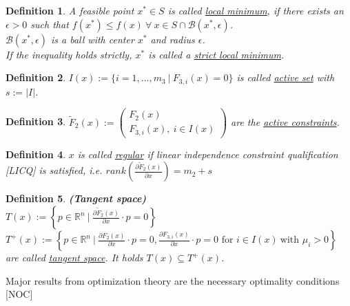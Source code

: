 \documentclass{scrartcl}[12pt, halfparskip]
\numberwithin{equation}{section}
\numberwithin{figure}{section}
\numberwithin{table}{section}
\newtheorem{Definition}{Definition}
\begin{document}
\begin{Definition}
	A feasible point $x^* \in S$ is called \underline{local minimum}, if there exists an $\epsilon > 0$ such that $f(x^*) \le f(x) \ \forall \ x \in S \cap \mathcal{B}(x^*, \epsilon)$. \\
	$\mathcal{B}(x^*, \epsilon)$ is a ball with center $x^*$ and radius $\epsilon$. \\
	If the inequality holds strictly, $x^*$ is called a \underline{strict local minimum}.
\end{Definition}

\begin{Definition}
	$I(x) := \{ i=1,...,m_3 \ | \ F_{3,i}(x) = 0 \}$ is called \underline{active set} with $s := \vert I \vert$.
\end{Definition}

\begin{Definition}
	$\tilde{F}_2(x) := 
	\begin{pmatrix}
		F_2(x) \\
		F_{3,i}(x), \ i \in I(x) 
	\end{pmatrix}$
	are the \underline{active constraints}.
\end{Definition}

\begin{Definition}
	$x$ is called \underline{regular} if linear independence constraint qualification [LICQ] is satisfied, i.e. $rank \left( \frac{\partial \tilde F_2(x)}{\partial x} \right) = m_2 + s$
\end{Definition}

\begin{Definition}
	\textbf{(Tangent space)} \\
	$T(x) := \left\{ p \in \mathbb{R}^n \ | \ \frac{\partial \tilde F_2(x)}{\partial x} \cdot p = 0 \right\}$ \\
	$T^+(x) := \left\{ p \in \mathbb{R}^n \ | \ \frac{\partial F_2(x)}{\partial x} \cdot p = 0, \frac{\partial F_{3,i}(x)}{\partial x} \cdot p = 0 \text{ for } i \in I(x) \ \text{with } \mu_i > 0 \right\}$ \\
	are called \underline{tangent space}. It holds $T(x) \subseteq T^+(x)$.
\end{Definition}

Major results from optimization theory are the necessary optimality conditions [NOC]
\end{document}

